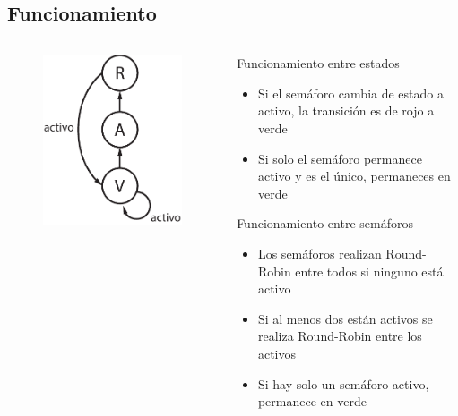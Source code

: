 \subsection{Funcionamiento}

\begin{frame}
	\begin{columns}[T]
		\begin{column}{.35\textwidth}

			\begin{figure}[ht]
				\centering 
				\includegraphics[scale=0.6]{diagramas/fsm-light.pdf}
			\end{figure}

		\end{column}
		\hfill
		\begin{column}{.65\textwidth}
			
			\begin{block}{Funcionamiento entre estados}
				\begin{itemize}
					\item Si el semáforo cambia de estado a activo, la transición es de rojo a verde
					\item Si solo el semáforo permanece activo y es el único, permaneces en verde
				\end{itemize}
			\end{block}
			\begin{block}{Funcionamiento entre semáforos}
				\begin{itemize}
					\item Los semáforos realizan Round-Robin entre todos si ninguno está activo
					\item Si al menos dos están activos se realiza Round-Robin entre los activos
					\item Si hay solo un semáforo activo, permanece en verde
				\end{itemize}
			\end{block}
		
		\end{column}
	\end{columns}
\end{frame}

